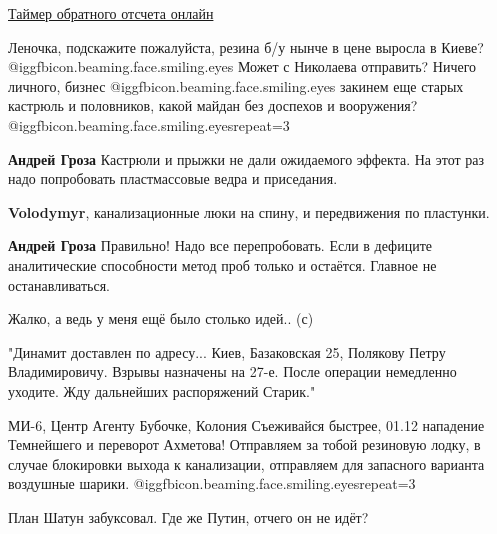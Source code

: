 \begin{itemize}

\href{https://countdown.onlinealarmkur.com/ru/#2021-12-01T00:00}{%
Таймер обратного отсчета онлайн%
}


Леночка, подскажите пожалуйста, резина б/у нынче в цене выросла в Киеве?  @igg{fbicon.beaming.face.smiling.eyes} 
Может с Николаева отправить? Ничего личного, бизнес  @igg{fbicon.beaming.face.smiling.eyes}  закинем еще старых
кастрюль и половников, какой майдан без доспехов и вооружения?  @igg{fbicon.beaming.face.smiling.eyes}{repeat=3} 

\begin{itemize} %
\textbf{Андрей Гроза} Кастрюли и прыжки не дали ожидаемого эффекта. На этот раз надо попробовать пластмассовые ведра и приседания.

\textbf{Volodymyr}, канализационные люки на спину, и передвижения по пластунки.

\textbf{Андрей Гроза} Правильно! Надо все перепробовать. Если в дефиците аналитические способности метод проб только и остаётся. Главное не останавливаться.

Жалко, а ведь у меня ещё было столько идей.. (с)
\end{itemize} %


\obeycr
"Динамит доставлен по адресу...
Киев,
Базаковская
25, Полякову Петру
Владимировичу.
Взрывы назначены на
27-е.
После операции немедленно уходите.
Жду дальнейших распоряжений
Старик."
\restorecr

\begin{itemize} %

\obeycr
МИ-6, Центр
Агенту Бубочке, Колония
Съеживайся быстрее, 01.12 нападение Темнейшего и переворот Ахметова!
Отправляем за тобой резиновую лодку, в случае блокировки выхода к канализации, отправляем для запасного варианта воздушные шарики.
 @igg{fbicon.beaming.face.smiling.eyes}{repeat=3} 
\restorecr
\end{itemize} %

План Шатун забуксовал. Где же Путин, отчего он не идёт?



\end{itemize}

